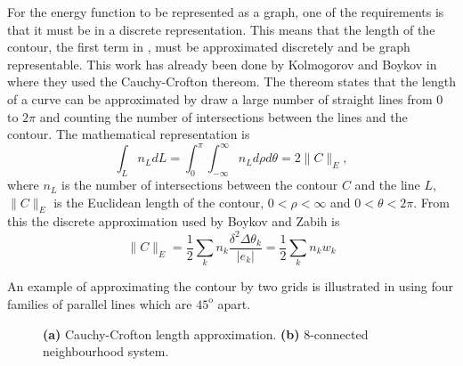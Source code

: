 \begin{definition}
	For the energy function to be represented as a graph, one of the requirements is that it must be in a discrete representation. This means that the length of the contour, the first term in , must be approximated discretely and be graph representable. This work has already been done by Kolmogorov and Boykov in \citep{Kolmogorov2005_2,Boykov2003} where they used the Cauchy-Crofton thereom. The thereom states that the length of a curve can be approximated by draw a large number of straight lines from $0$ to $2\pi$ and counting the number of intersections between the lines and the contour. The mathematical representation is
	\begin{equation}
		\int_L n_L dL = \int_{0}^{\pi}\int_{-\infty}^{\infty} n_L d\rho d\theta = 2 \lVert C \rVert_E,
	\end{equation}
	where $n_L$ is the number of intersections between the contour $C$ and the line $L$, $ \lVert C \rVert_E$ is the Euclidean length of the contour, $0 < \rho < \infty$ and $0 < \theta < 2\pi$. From this the discrete approximation used by Boykov and Zabih is 
	\begin{equation}
		\lVert C \rVert_E = \frac{1}{2}\sum_k n_k \frac{\delta^2 \Delta\theta_k}{|e_k|} = \frac{1}{2}\sum_k n_k w_k
		\label{eq:discretelength}
	\end{equation}
\end{definition}
An example of approximating the contour by two grids is illustrated in  using four families of parallel lines which are $45^\text{o}$ apart.

\begin{figure}[!t]
	\centering
	\caption{\textbf{(a)} Cauchy-Crofton length approximation. \textbf{(b)} 8-connected neighbourhood system.}
	\label{fig:chanveseN8}
\end{figure}


